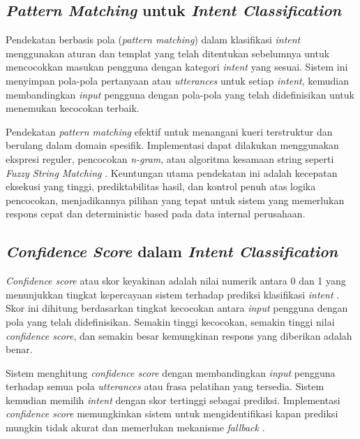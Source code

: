 \subsection{\textit{Pattern Matching} untuk \textit{Intent Classification}}

Pendekatan berbasis pola (\textit{pattern matching}) dalam klasifikasi \textit{intent} menggunakan aturan dan templat yang telah ditentukan sebelumnya untuk mencocokkan masukan pengguna dengan kategori \textit{intent} yang sesuai. Sistem ini menyimpan pola-pola pertanyaan atau \textit{utterances} untuk setiap \textit{intent}, kemudian membandingkan \textit{input} pengguna dengan pola-pola yang telah didefinisikan untuk menemukan kecocokan terbaik.

Pendekatan \textit{pattern matching} efektif untuk menangani kueri terstruktur dan berulang dalam domain spesifik. Implementasi dapat dilakukan menggunakan ekspresi reguler, pencocokan \textit{n-gram}, atau algoritma kesamaan string seperti \textit{Fuzzy String Matching} \autocite{mulyatun2021chatbot}. Keuntungan utama pendekatan ini adalah kecepatan eksekusi yang tinggi, prediktabilitas hasil, dan kontrol penuh atas logika pencocokan, menjadikannya pilihan yang tepat untuk sistem yang memerlukan respons cepat dan deterministic based pada data internal perusahaan.

\subsection{\textit{Confidence Score} dalam \textit{Intent Classification}}

\textit{Confidence score} atau skor keyakinan adalah nilai numerik antara 0 dan 1 yang menunjukkan tingkat kepercayaan sistem terhadap prediksi klasifikasi \textit{intent} \autocite{khosla2022evaluating}. Skor ini dihitung berdasarkan tingkat kecocokan antara \textit{input} pengguna dengan pola yang telah didefinisikan. Semakin tinggi kecocokan, semakin tinggi nilai \textit{confidence score}, dan semakin besar kemungkinan respons yang diberikan adalah benar.

Sistem menghitung \textit{confidence score} dengan membandingkan \textit{input} pengguna terhadap semua pola \textit{utterances} atau frasa pelatihan yang tersedia. Sistem kemudian memilih \textit{intent} dengan skor tertinggi sebagai prediksi. Implementasi \textit{confidence score} memungkinkan sistem untuk mengidentifikasi kapan prediksi mungkin tidak akurat dan memerlukan mekanisme \textit{fallback} \autocite{kuligowska2024enhancing}.

